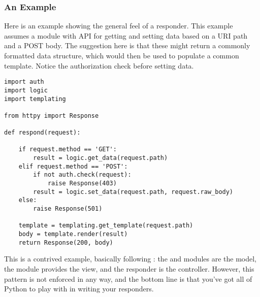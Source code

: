 \subsubsection{An Example}

Here is an example showing the general feel of a responder. This example assumes
a  module with API for getting and setting data based on a URI path
and a POST body. The suggestion here is that these might return a commonly
formatted data structure, which would then be used to populate a common
template. Notice the authorization check before setting data.

\begin{verbatim}
import auth
import logic
import templating

from httpy import Response

def respond(request):

    if request.method == 'GET':
        result = logic.get_data(request.path)
    elif request.method == 'POST':
        if not auth.check(request):
            raise Response(403)
        result = logic.set_data(request.path, request.raw_body)
    else:
        raise Response(501)

    template = templating.get_template(request.path)
    body = template.render(result)
    return Response(200, body)

\end{verbatim}


This is a contrived example, basically following : the
 and  modules are the model, the 
module provides the view, and the responder is the controller. However, this
pattern is not enforced in any way, and the bottom line is that you've got all
of Python to play with in writing your responders.
